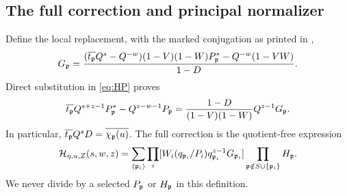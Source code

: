 \subsection{The full correction and principal normalizer}
Define the local replacement, with the marked conjugation as printed in ,
\begin{equation}\label{eq:Gprime}
 G_\mathfrak p=\frac{(\overline{t_\mathfrak p}Q^s-Q^{-w})(1-V)(1-W)P_\mathfrak p^*
                     -Q^{-w}(1-VW)}{1-D}.
\end{equation}
Direct substitution in \eqref{eq:HP} proves
\begin{equation}\label{eq:localidentity}
 \overline{t_\mathfrak p}Q^{s+z-1}P_\mathfrak p^*-Q^{z-w-1}P_\mathfrak p
 =\frac{1-D}{(1-V)(1-W)}Q^{z-1}G_\mathfrak p.
\end{equation}
In particular, $\overline{t_\mathfrak p}Q^sD=\overline{\chi_\mathfrak p(u)}$. The full correction is the quotient-free expression
\begin{equation}\label{eq:fullcorrection}
 \mathcal H_{\eta,u,Z}(s,w,z)=\sum_{(\mathfrak p_i)}
 \prod_i[W_i(q_{\mathfrak p_i}/P_i)q_{\mathfrak p_i}^{z-1}G_{\mathfrak p_i}]
 \prod_{\mathfrak p\notin S\cup\{\mathfrak p_i\}}H_\mathfrak p.
\end{equation}
We never divide by a selected $P_\mathfrak p$ or $H_\mathfrak p$ in this definition.

